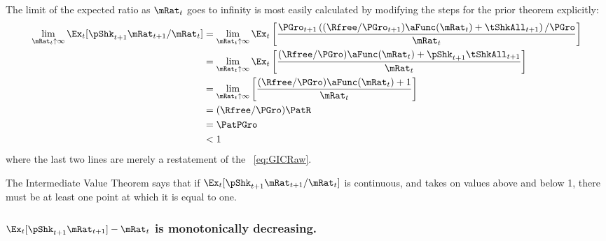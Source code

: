 \documentclass[\econtexRoot/BufferStockTheory]{subfiles}
\begin{document}
The limit of the expected ratio as $\mRat_{t}$ goes to infinity is most easily calculated by modifying the steps for the prior theorem explicitly:
\begin{align}
  \lim_{\mRat_{t} \uparrow \infty} \Ex_{t}[\pShk_{t+1}\mRat_{t+1}/\mRat_{t}]  & =   
                                                                  \lim_{\mRat_{t} \uparrow \infty} 
                                                                  \Ex_{t}\left[\frac{\PGro_{t+1}\left((\Rfree/\PGro_{t+1})\aFunc(\mRat_{t})+{\tShkAll}_{t+1}\right)/\PGro}{\mRat_{t}}\right] \notag 
  \\   & =   \lim_{\mRat_{t} \uparrow \infty} \Ex_{t}\left[
         \frac{(\Rfree/\PGro)\aFunc(\mRat_{t})+\pShk_{t+1}{\tShkAll}_{t+1}}{\mRat_{t}}
         \right] \notag 
  \\   & =   \lim_{\mRat_{t} \uparrow \infty} \left[
         \frac{(\Rfree/\PGro)\aFunc(\mRat_{t})+1}{\mRat_{t}}
         \right] \notag 
  \\  & = (\Rfree/\PGro)\PatR \label{eq:emgro2}
  \\  & = \PatPGro \notag
  \\  & < 1 \notag
\end{align}
where the last two lines are merely a restatement of the \GICRaw~\eqref{eq:GICRaw}.

The Intermediate Value Theorem says that if $\Ex_{t}[\pShk_{t+1}\mRat_{t+1}/\mRat_t]$ is continuous, and takes on values above and below 1, there must be at least one point at which it is equal to one.

\subsubsection{$\Ex_{t}[\pShk_{t+1}\mRat_{t+1}] -\mRat_t$ is monotonically decreasing.}
\end{document}

